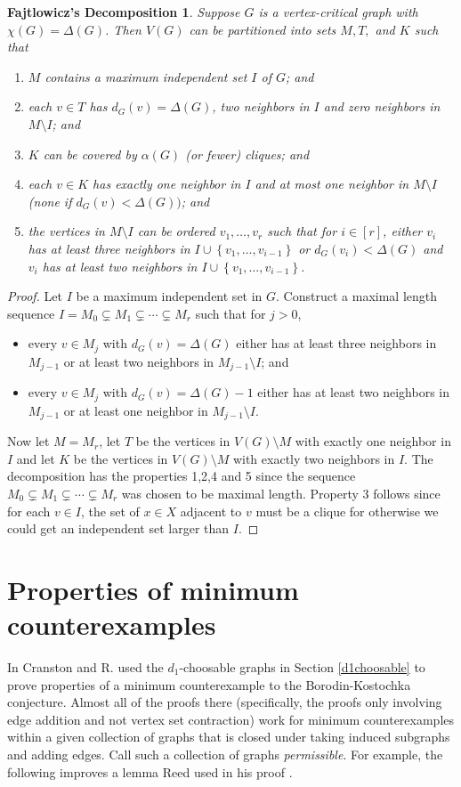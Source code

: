 \documentclass[12pt]{article}
\theoremstyle{plain}
\newtheorem*{FajtlowiczDecomp}{Fajtlowicz's Decomposition}
\theoremstyle{definition}
\theoremstyle{remark}
\newcommand{\set}[1]{\left\{ #1 \right\}}
\newcommand{\irange}[1]{\left[#1\right]}
\begin{document}
\begin{FajtlowiczDecomp}
Suppose $G$ is a vertex-critical graph with $\chi(G) = \Delta(G)$.  Then $V(G)$ can be partitioned into sets $M, T,$ and $K$ such that
\begin{enumerate}
\item $M$ contains a maximum independent set $I$ of $G$; and
\item each $v \in T$ has $d_G(v) = \Delta(G)$, two neighbors in $I$ and zero neighbors in $M\setminus I$; and
\item $K$ can be covered by $\alpha(G)$ (or fewer) cliques; and
\item each $v \in K$ has exactly one neighbor in $I$ and at most one neighbor in $M\setminus I$ (none if $d_G(v) < \Delta(G))$; and
\item the vertices in $M \setminus I$ can be ordered $v_1, \ldots, v_r$ such that for $i \in \irange{r}$, either $v_i$ has at least three neighbors in $I \cup \set{v_1, \ldots, v_{i-1}}$
or $d_G(v_i) < \Delta(G)$ and $v_i$ has at least two neighbors in $I \cup \set{v_1, \ldots, v_{i-1}}$.
\end{enumerate}
\end{FajtlowiczDecomp}
\begin{proof}
Let $I$ be a maximum independent set in $G$.  Construct a maximal length sequence $I = M_0 \subsetneq M_1 \subsetneq \cdots \subsetneq M_r$ such that for $j>0$, 
\begin{itemize}
\item every $v \in M_j$ with $d_G(v) = \Delta(G)$ either has at least three neighbors in $M_{j-1}$ or at least two neighbors in $M_{j-1} \setminus I$; and
\item every $v \in M_j$ with $d_G(v) = \Delta(G) - 1$ either has at least two neighbors in $M_{j-1}$ or at least one neighbor in $M_{j-1} \setminus I$.
\end{itemize}
Now let $M = M_r$, let $T$ be the vertices in $V(G) \setminus M$ with exactly one neighbor in $I$ and let $K$ be the vertices in $V(G) \setminus M$ with exactly two neighbors in $I$.
The decomposition has the properties 1,2,4 and 5 since the sequence $M_0 \subsetneq M_1 \subsetneq \cdots \subsetneq M_r$ was chosen to be maximal length.  Property 3 follows since
for each $v \in I$, the set of $x \in X$ adjacent to $v$ must be a clique for otherwise we could get an independent set larger than $I$.
\end{proof}

\section{Properties of minimum counterexamples}
In \cite{cranstonrabernapriori} Cranston and R. used the $d_1$-choosable graphs in Section \ref{d1choosable} to prove properties 
of a minimum counterexample to the Borodin-Kostochka conjecture.  Almost all of the proofs there (specifically, the proofs only involving edge addition and not vertex set contraction)
work for minimum counterexamples within a given collection of graphs that is closed under taking induced subgraphs and adding edges.  Call such a collection of graphs \emph{permissible}.
For example, the following improves a lemma Reed used in his proof \cite{reed1999strengthening}.
\end{document}
